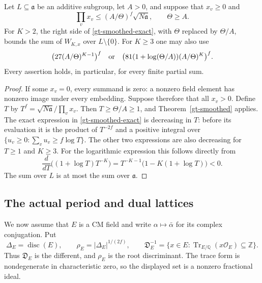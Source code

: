 \begin{corollary}\label{gt-subgroup-sum}
Let $L\subseteq\mathfrak a$ be an additive subgroup, let $A>0$,
and suppose that $x_v\geq0$ and
\begin{equation}\label{gt-product-size}
 \prod_vx_v\leq(A/\Theta)^f\sqrt{N\mathfrak a},
 \qquad \Theta\geq A.
\end{equation}
For $K>2$, the right side of \eqref{gt-smoothed-exact}, with
$\Theta$ replaced by $\Theta/A$, bounds the sum of $W_{K,x}$ over
$L\setminus\{0\}$.  For $K\geq3$ one may also use
\begin{equation}\label{gt-subgroup-simple}
 \bigl(27(A/\Theta)^{K-1}\bigr)^f
 \quad\hbox{or}\quad
 \bigl(81(1+\log(\Theta/A))(A/\Theta)^K\bigr)^f.
\end{equation}
Every assertion holds, in particular, for every finite partial sum.
\end{corollary}

\begin{proof}
If some $x_v=0$, every summand is zero: a nonzero field element has
nonzero image under every embedding.  Suppose therefore that all
$x_v>0$.  Define $T$ by
$T^f=\sqrt{N\mathfrak a}/\prod_vx_v$.  Then
$T\geq\Theta/A\geq1$, and Theorem~\ref{gt-smoothed} applies.
The exact expression in \eqref{gt-smoothed-exact} is decreasing in
$T$: before its evaluation it is the product of $T^{-2f}$ and a
positive integral over
$\{u_v\geq0:\sum_vu_v\geq f\log T\}$.
The other two expressions are also decreasing for $T\geq1$ and
$K\geq3$.  For the logarithmic expression this follows directly from
\[
 \frac{d}{dT}\bigl((1+\log T)T^{-K}\bigr)
       =T^{-K-1}\bigl(1-K(1+\log T)\bigr)<0.
\]
The sum over $L$ is at most the sum over $\mathfrak a$.
\end{proof}

\subsection{The actual period and dual lattices}

We now assume that $E$ is a CM field and write
$\alpha\mapsto\bar\alpha$ for its complex conjugation.  Put
\[
 \Delta_E=\operatorname{disc}(E),\qquad
 \rho_E=|\Delta_E|^{1/(2f)},\qquad
 \mathfrak D_E^{-1}
   =\{x\in E:\operatorname{Tr}_{E/\mathbb Q}
                          (x\mathcal O_E)\subseteq\mathbb Z\}.
\]
Thus $\mathfrak D_E$ is the different, and $\rho_E$ is the root
discriminant.  The trace form is nondegenerate in characteristic
zero, so the displayed set is a nonzero fractional ideal.

